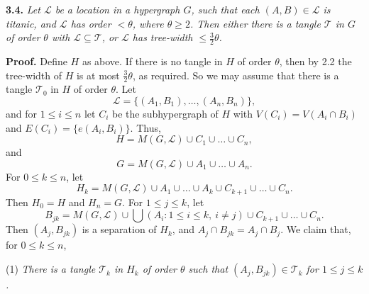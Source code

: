 \textbf{3.4.} \textit{Let $\mathscr{L}$ be a location in a hypergraph $G$, such that each $(A, B) \in \mathscr{L}$ is titanic, and $\mathscr{L}$ has order $< \theta$, where $\theta \ge 2$. Then either there is a tangle $\mathscr{T}$ in $G$ of order $\theta$ with $\mathscr{L} \subseteq \mathscr{T}$, or $\mathscr{L}$ has tree-width $\le \frac{3}{2}\theta$.}

\textbf{Proof.} Define $H$ as above. If there is no tangle in $H$ of order $\theta$, then by 2.2 the tree-width of $H$ is at most $\frac{3}{2}\theta$, as required. So we may assume that there is a tangle $\mathscr{T}_0$ in $H$ of order $\theta$. Let
\begin{equation*}
\mathscr{L} = \{(A_1, B_1), \dots, (A_n, B_n)\},
\end{equation*}
and for $1 \le i \le n$ let $C_i$ be the subhypergraph of $H$ with $V(C_i) = V(A_i \cap B_i)$ and $E(C_i) = \{e(A_i, B_i)\}$. Thus,
\begin{equation*}
H = M(G, \mathscr{L}) \cup C_1 \cup \dots \cup C_n,
\end{equation*}
and
\begin{equation*}
G = M(G, \mathscr{L}) \cup A_1 \cup \dots \cup A_n.
\end{equation*}
For $0 \le k \le n$, let
\begin{equation*}
H_k = M(G, \mathscr{L}) \cup A_1 \cup \dots \cup A_k \cup C_{k+1} \cup \dots \cup C_n.
\end{equation*}
Then $H_0 = H$ and $H_n = G$. For $1 \le j \le k$, let
\begin{equation*}
B_{jk} = M(G, \mathscr{L}) \cup \bigcup (A_i \colon 1 \le i \le k, \ i \ne j) \cup C_{k+1} \cup \dots \cup C_n.
\end{equation*}
Then $(A_j, B_{jk})$ is a separation of $H_k$, and $A_j \cap B_{jk} = A_j \cap B_j$. We claim that, for $0 \le k \le n$,

\hspace*{12pt}(1) \textit{There is a tangle $\mathscr{T}_k$ in $H_k$ of order $\theta$ such that $(A_j, B_{jk}) \in \mathscr{T}_k$ for $1 \le j \le k$.}

